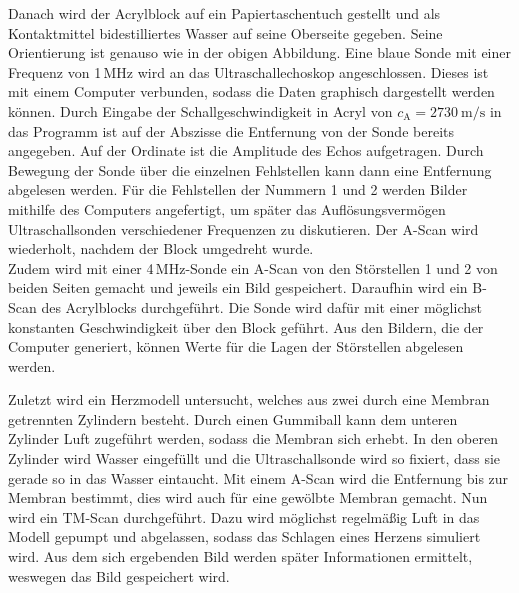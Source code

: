 Danach wird der Acrylblock auf ein Papiertaschentuch gestellt und als Kontaktmittel
bidestilliertes Wasser auf seine Oberseite gegeben. Seine Orientierung ist genauso wie in
der obigen Abbildung. Eine blaue Sonde mit einer Frequenz von 1\,MHz wird an das
Ultraschallechoskop angeschlossen. Dieses ist mit einem Computer verbunden, sodass
die Daten graphisch dargestellt werden können. Durch Eingabe der Schallgeschwindigkeit
in Acryl von $c_\text{A} = \SI{2730}{\meter\per\second}$ in das Programm ist auf der Abszisse die
Entfernung von der Sonde bereits angegeben. Auf der Ordinate ist die Amplitude des Echos
aufgetragen. Durch Bewegung der Sonde über die einzelnen Fehlstellen kann dann eine
Entfernung abgelesen werden. Für die Fehlstellen der Nummern 1 und 2 werden Bilder mithilfe
des Computers angefertigt, um später das Auflösungsvermögen Ultraschallsonden verschiedener
Frequenzen zu diskutieren. Der A-Scan wird wiederholt, nachdem der Block umgedreht wurde.\\
Zudem wird mit einer 4\,MHz-Sonde ein A-Scan von den Störstellen 1 und 2 von beiden Seiten
gemacht und jeweils ein Bild gespeichert.
Daraufhin wird ein B-Scan des Acrylblocks durchgeführt. Die Sonde wird dafür mit einer
möglichst konstanten Geschwindigkeit über den Block geführt. Aus den Bildern, die
der Computer generiert, können Werte für die Lagen der Störstellen abgelesen werden.

Zuletzt wird ein Herzmodell untersucht, welches aus zwei durch eine Membran getrennten Zylindern
besteht. Durch einen Gummiball kann dem unteren Zylinder Luft zugeführt werden, sodass die Membran
sich erhebt. In den oberen Zylinder wird Wasser eingefüllt und die Ultraschallsonde
wird so fixiert, dass sie gerade so in das Wasser eintaucht. Mit einem A-Scan wird die
Entfernung bis zur Membran bestimmt, dies wird auch für eine gewölbte Membran gemacht.
Nun wird ein TM-Scan durchgeführt. Dazu wird möglichst regelmäßig Luft in das Modell
gepumpt und abgelassen, sodass das Schlagen eines Herzens simuliert wird. Aus dem
sich ergebenden Bild werden später Informationen ermittelt, weswegen das Bild gespeichert wird.
